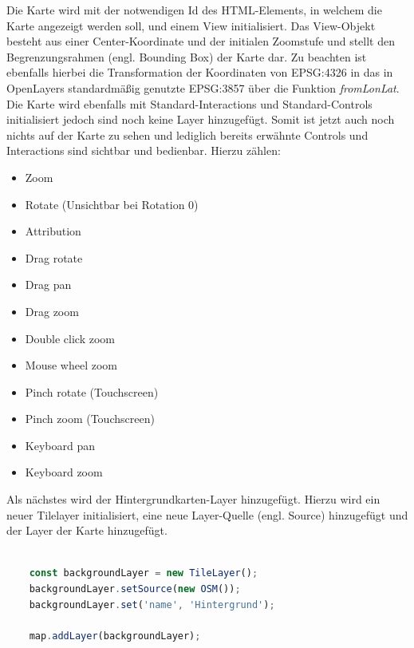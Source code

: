 Die Karte wird mit der notwendigen Id des HTML-Elements, in welchem die Karte angezeigt werden soll, und einem View initialisiert.
Das View-Objekt besteht aus einer Center-Koordinate und der initialen Zoomstufe und stellt den Begrenzungsrahmen (engl. Bounding Box) der Karte dar.
Zu beachten ist ebenfalls hierbei die Transformation der Koordinaten von EPSG:4326 in das in OpenLayers standardmäßig genutzte EPSG:3857 über die Funktion \emph{fromLonLat}.
Die Karte wird ebenfalls mit Standard-Interactions und Standard-Controls initialisiert jedoch sind noch keine Layer hinzugefügt.
Somit ist jetzt auch noch nichts auf der Karte zu sehen und lediglich bereits erwähnte Controls und Interactions sind sichtbar und bedienbar.
Hierzu zählen:

\begin{itemize}[Controls]
	\item Zoom
	\item Rotate (Unsichtbar bei Rotation 0)
	\item Attribution
\end{itemize}

\begin{itemize}[Interactions]
	\item Drag rotate
	\item Drag pan
	\item Drag zoom
	\item Double click zoom
	\item Mouse wheel zoom
	\item Pinch rotate (Touchscreen)
	\item Pinch zoom (Touchscreen)
	\item Keyboard pan
	\item Keyboard zoom
\end{itemize}

Als nächstes wird der Hintergrundkarten-Layer hinzugefügt.
Hierzu wird ein neuer Tilelayer initialisiert, eine neue Layer-Quelle (engl. Source) hinzugefügt und der Layer der Karte hinzugefügt.

\begin{lstlisting}[language=JavaScript, caption={Erstellung der Hintergrundkarte}]
	
	const backgroundLayer = new TileLayer();
	backgroundLayer.setSource(new OSM());
	backgroundLayer.set('name', 'Hintergrund');
	
	map.addLayer(backgroundLayer);	
	
\end{lstlisting}

